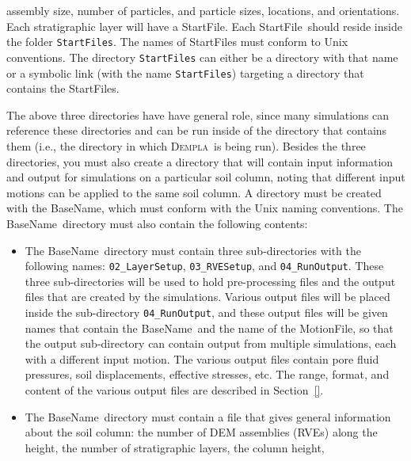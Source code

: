 \documentclass[letterpaper,11pt]{article}
\newcommand{\Dempla}{\textsc{Dempla}}
\newcommand{\StartFile}{\textsf{StartFile}}
\newcommand{\BaseName}{\textsf{BaseName}}
\newcommand{\MotionFile}{\textsf{MotionFile}}
\begin{document}
\begin{itemize}
\begin{itemize}
        assembly size, number of particles, and
        particle sizes, locations, and orientations.
        Each stratigraphic layer will have a \StartFile.
        Each \StartFile\ should reside inside the
        folder \texttt{StartFiles}.
        The names of \StartFile s must conform
        to Unix conventions.
        The directory \texttt{StartFiles} can either
        be a directory with that name or a symbolic link
        (with the name \texttt{StartFiles}) targeting
        a directory that contains the \StartFile s.
    \end{itemize}
%
    The above three directories have have general role,
    since many simulations can reference these directories
    and can be run inside of the directory that contains
    them (i.e., the directory in which \Dempla\ is being run).
    Besides the three directories, you must also create
    a directory that will contain input information and output
    for simulations on a particular soil column,
    noting that
    different input motions can be applied to the same
    soil column.
    A directory must be created with the \BaseName,
    which must conform with the Unix naming conventions.
    The \BaseName\ directory must also contain the following
    contents:
    \begin{itemize}
      \item
        The \BaseName\ directory must contain three sub-directories
        with the following names:
        \texttt{02\_LayerSetup}, \texttt{03\_RVESetup},
        and \texttt{04\_RunOutput}.
        These three sub-directories will be used to hold
        pre-processing files and the output files that are
        created by the simulations.
        Various output files will be placed inside the
        sub-directory \texttt{04\_RunOutput}, and these
        output files will be given names that contain
        the \BaseName\ and the name of the \MotionFile,
        so that the output sub-directory can contain
        output from multiple simulations, each with a different
        input motion.
        The various output files contain pore fluid pressures,
        soil displacements, effective stresses, etc.
        The range, format, and content of the various output files
        are described in Section~\ref{}.
      \item
        The \BaseName\ directory must contain a file that gives
        general information about the soil column:
        the number of DEM assemblies (RVEs) along the height,
        the number of stratigraphic layers, the column height,

\end{itemize}
\end{itemize}
\end{document}
